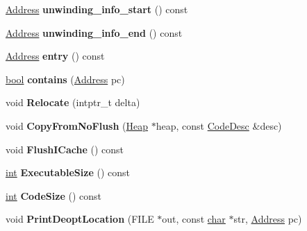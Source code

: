 \begin{DoxyCompactItemize}
\mbox{\hyperlink{classuintptr__t}{Address}} {\bfseries unwinding\+\_\+info\+\_\+start} () const
\item 
\mbox{\label{classv8_1_1internal_1_1Code_a33fc9012b12edd2838740517d86ffd8b}} 
\mbox{\hyperlink{classuintptr__t}{Address}} {\bfseries unwinding\+\_\+info\+\_\+end} () const
\item 
\mbox{\label{classv8_1_1internal_1_1Code_a258b2d645865335e169f61024c1cc1e1}} 
\mbox{\hyperlink{classuintptr__t}{Address}} {\bfseries entry} () const
\item 
\mbox{\label{classv8_1_1internal_1_1Code_aafef5aa1b4cf573c27cd076a4eed587e}} 
\mbox{\hyperlink{classbool}{bool}} {\bfseries contains} (\mbox{\hyperlink{classuintptr__t}{Address}} pc)
\item 
\mbox{\label{classv8_1_1internal_1_1Code_a1e871f321b98ede8b77db33826a2b1c1}} 
void {\bfseries Relocate} (intptr\+\_\+t delta)
\item 
\mbox{\label{classv8_1_1internal_1_1Code_a7cb0b0b9a2bf505ab5afbb4f067b0dee}} 
void {\bfseries Copy\+From\+No\+Flush} (\mbox{\hyperlink{classv8_1_1internal_1_1Heap}{Heap}} $\ast$heap, const \mbox{\hyperlink{structv8_1_1internal_1_1CodeDesc}{Code\+Desc}} \&desc)
\item 
\mbox{\label{classv8_1_1internal_1_1Code_ab8710c29dd59b5676719eda7ebc3fcdc}} 
void {\bfseries Flush\+I\+Cache} () const
\item 
\mbox{\label{classv8_1_1internal_1_1Code_ad4dcee78b7a6cdab4d34ec329772b588}} 
\mbox{\hyperlink{classint}{int}} {\bfseries Executable\+Size} () const
\item 
\mbox{\label{classv8_1_1internal_1_1Code_a86639ce29b95fe4699ef93e3adef5a1c}} 
\mbox{\hyperlink{classint}{int}} {\bfseries Code\+Size} () const
\item 
\mbox{\label{classv8_1_1internal_1_1Code_ad4d78beb9ea117ba90408ca721ef25d0}} 
void {\bfseries Print\+Deopt\+Location} (F\+I\+LE $\ast$out, const \mbox{\hyperlink{classchar}{char}} $\ast$str, \mbox{\hyperlink{classuintptr__t}{Address}} pc)

\end{DoxyCompactItemize}
